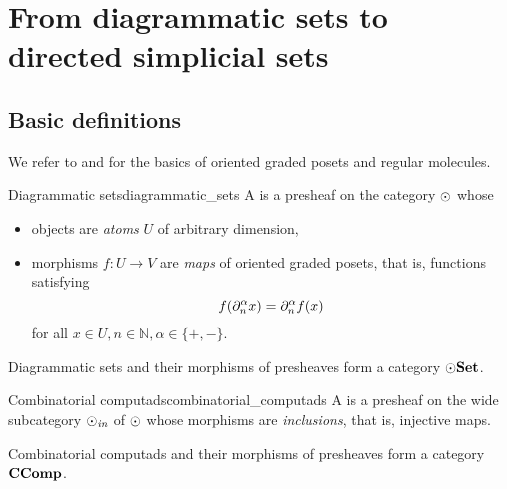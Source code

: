 \section{From diagrammatic sets to directed simplicial sets}

\subsection{Basic definitions}

We refer to \cite{hadzihasanovic_diagrammatic_2020} and \cite{hadzihasanovic_data_2022} for the basics of oriented graded posets and regular molecules.

\begin{cdef}{Diagrammatic sets}{diagrammatic_sets}
	A  is a presheaf on the category \( \odot \) whose
	\begin{itemize}
		\item objects are \emph{atoms} \( U \) of arbitrary dimension,
		\item morphisms \( f\colon U \to V \) are \emph{maps} of oriented graded posets, that is, functions satisfying
			\begin{equation*}
				f(\partial_{n}^{\alpha}x) = \partial_{n}^{\alpha}f(x)
			\end{equation*}
		for all \( x \in U, n \in \mathbb{N}, \alpha \in \{ +, - \} \).
	\end{itemize}
	Diagrammatic sets and their morphisms of presheaves form a category \( \odot\mathbf{Set} \).
\end{cdef}

\begin{cdef}{Combinatorial computads}{combinatorial_computads}
	A  is a presheaf on the wide subcategory \( \odot_\textit{in} \) of \( \odot \) whose morphisms are \emph{inclusions}, that is, injective maps.

	Combinatorial computads and their morphisms of presheaves form a category \( \mathbf{CComp} \).
\end{cdef}

